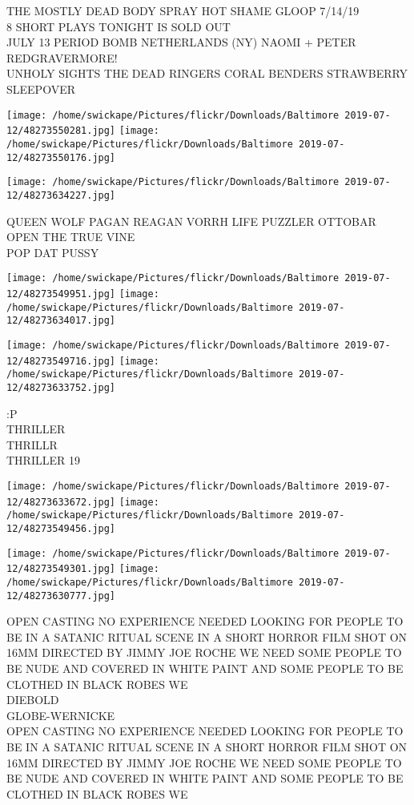 \documentclass[10pt,letterpaper]{article}
\begin{document}
THE MOSTLY DEAD BODY SPRAY HOT SHAME GLOOP 7/14/19\\
8 SHORT PLAYS TONIGHT IS SOLD OUT\\
JULY 13 PERIOD BOMB NETHERLANDS (NY) NAOMI + PETER REDGRAVERMORE!\\
UNHOLY SIGHTS THE DEAD RINGERS CORAL BENDERS STRAWBERRY SLEEPOVER
\pagebreak

\texttt{[image: /home/swickape/Pictures/flickr/Downloads/Baltimore 2019-07-12/48273550281.jpg]}
\texttt{[image: /home/swickape/Pictures/flickr/Downloads/Baltimore 2019-07-12/48273550176.jpg]}

\vspace{0.25in}
\texttt{[image: /home/swickape/Pictures/flickr/Downloads/Baltimore 2019-07-12/48273634227.jpg]}

QUEEN WOLF PAGAN REAGAN VORRH LIFE PUZZLER OTTOBAR\\
OPEN THE TRUE VINE\\
POP DAT PUSSY
\pagebreak

\texttt{[image: /home/swickape/Pictures/flickr/Downloads/Baltimore 2019-07-12/48273549951.jpg]}
\texttt{[image: /home/swickape/Pictures/flickr/Downloads/Baltimore 2019-07-12/48273634017.jpg]}

\texttt{[image: /home/swickape/Pictures/flickr/Downloads/Baltimore 2019-07-12/48273549716.jpg]}
\texttt{[image: /home/swickape/Pictures/flickr/Downloads/Baltimore 2019-07-12/48273633752.jpg]}

:P\\
THRILLER\\
THRILLR\\
THRILLER 19
\pagebreak

\texttt{[image: /home/swickape/Pictures/flickr/Downloads/Baltimore 2019-07-12/48273633672.jpg]}
\texttt{[image: /home/swickape/Pictures/flickr/Downloads/Baltimore 2019-07-12/48273549456.jpg]}

\texttt{[image: /home/swickape/Pictures/flickr/Downloads/Baltimore 2019-07-12/48273549301.jpg]}
\texttt{[image: /home/swickape/Pictures/flickr/Downloads/Baltimore 2019-07-12/48273630777.jpg]}

OPEN CASTING NO EXPERIENCE NEEDED LOOKING FOR PEOPLE TO BE IN A SATANIC RITUAL SCENE IN A SHORT HORROR FILM SHOT ON 16MM DIRECTED BY JIMMY JOE ROCHE WE NEED SOME PEOPLE TO BE NUDE AND COVERED IN WHITE PAINT AND SOME PEOPLE TO BE CLOTHED IN BLACK ROBES WE\\
DIEBOLD\\
GLOBE{-}WERNICKE\\
OPEN CASTING NO EXPERIENCE NEEDED LOOKING FOR PEOPLE TO BE IN A SATANIC RITUAL SCENE IN A SHORT HORROR FILM SHOT ON 16MM DIRECTED BY JIMMY JOE ROCHE WE NEED SOME PEOPLE TO BE NUDE AND COVERED IN WHITE PAINT AND SOME PEOPLE TO BE CLOTHED IN BLACK ROBES WE
\pagebreak
\end{document}
